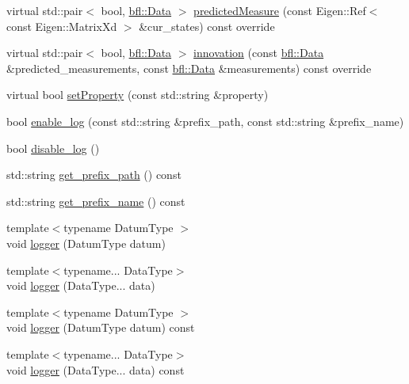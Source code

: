 \begin{DoxyCompactItemize}
virtual std\+::pair$<$ bool, \mbox{\hyperlink{namespacebfl_af6b103c6821db1b54452f776fdd9dd02}{bfl\+::\+Data}} $>$ \mbox{\hyperlink{classbfl_1_1LinearMeasurementModel_a8831b8acb4790db4c69db73200375c69}{predicted\+Measure}} (const Eigen\+::\+Ref$<$ const Eigen\+::\+Matrix\+Xd $>$ \&cur\+\_\+states) const override
\item 
virtual std\+::pair$<$ bool, \mbox{\hyperlink{namespacebfl_af6b103c6821db1b54452f776fdd9dd02}{bfl\+::\+Data}} $>$ \mbox{\hyperlink{classbfl_1_1LinearMeasurementModel_a12485b4b6d511e97e338a4db6861b277}{innovation}} (const \mbox{\hyperlink{namespacebfl_af6b103c6821db1b54452f776fdd9dd02}{bfl\+::\+Data}} \&predicted\+\_\+measurements, const \mbox{\hyperlink{namespacebfl_af6b103c6821db1b54452f776fdd9dd02}{bfl\+::\+Data}} \&measurements) const override
\item 
virtual bool \mbox{\hyperlink{classbfl_1_1MeasurementModel_af97e18b52d1a3f365dd5982b8cc4aff7}{set\+Property}} (const std\+::string \&property)
\item 
bool \mbox{\hyperlink{classbfl_1_1Logger_ae94b97b6e8d7902e8ce048384813122e}{enable\+\_\+log}} (const std\+::string \&prefix\+\_\+path, const std\+::string \&prefix\+\_\+name)
\item 
bool \mbox{\hyperlink{classbfl_1_1Logger_a440467a28ccc46490d767fe0ef6f556a}{disable\+\_\+log}} ()
\item 
std\+::string \mbox{\hyperlink{classbfl_1_1Logger_a56cf1a4e712bf23d9978420a8a59a62b}{get\+\_\+prefix\+\_\+path}} () const
\item 
std\+::string \mbox{\hyperlink{classbfl_1_1Logger_a913a795b7bfbf378815eeb342d68a7c0}{get\+\_\+prefix\+\_\+name}} () const
\item 
{\footnotesize template$<$typename Datum\+Type $>$ }\\void \mbox{\hyperlink{classbfl_1_1Logger_a1033ff31398484f2132f84fd140da9e3}{logger}} (Datum\+Type datum)
\item 
{\footnotesize template$<$typename... Data\+Type$>$ }\\void \mbox{\hyperlink{classbfl_1_1Logger_aca2086c9256e5c404872b91f7f25b97d}{logger}} (Data\+Type... data)
\item 
{\footnotesize template$<$typename Datum\+Type $>$ }\\void \mbox{\hyperlink{classbfl_1_1Logger_a50b1c109730fa98f66e66f420f0158fe}{logger}} (Datum\+Type datum) const
\item 
{\footnotesize template$<$typename... Data\+Type$>$ }\\void \mbox{\hyperlink{classbfl_1_1Logger_a0f0cf7ce956546d94dfb1feb7cebf171}{logger}} (Data\+Type... data) const
\end{DoxyCompactItemize}
